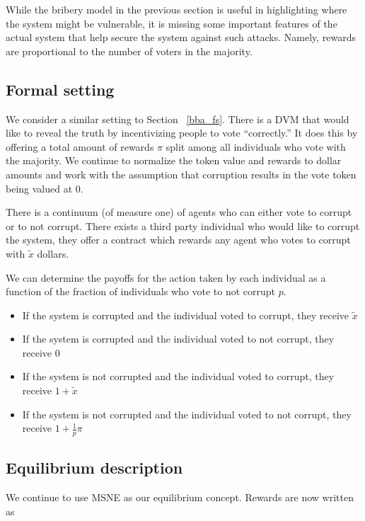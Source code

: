 \documentclass[12pt]{article}
\begin{document}
  While the bribery model in the previous section is useful in highlighting where the system might
  be vulnerable, it is missing some important features of the actual system that help secure the
  system against such attacks. Namely, rewards are proportional to the number of voters in the
  majority.

  \subsection{Formal setting}

    We consider a similar setting to Section ~\ref{bba_fs}. There is a DVM that would like to
    reveal the truth by incentivizing people to vote ``correctly.'' It does this by offering a
    total amount of rewards $\pi$ split among all individuals who vote with the majority. We
    continue to normalize the token value and rewards to dollar amounts and work with the
    assumption that corruption results in the vote token being valued at 0.

    There is a continuum (of measure one) of agents who can either vote to corrupt or to not
    corrupt. There exists a third party individual who would like to corrupt the system, they
    offer a contract which rewards any agent who votes to corrupt with $\tilde{x}$ dollars.

    We can determine the payoffs for the action taken by each individual as a function of the
    fraction of individuals who vote to not corrupt $p$.

    \begin{itemize}
      \item If the system is corrupted and the individual voted to corrupt, they receive
        $\tilde{x}$
      \item If the system is corrupted and the individual voted to not corrupt, they receive $0$
      \item If the system is not corrupted and the individual voted to corrupt, they receive
        $1 + \tilde{x}$
      \item If the system is not corrupted and the individual voted to not corrupt, they receive
        $1 + \frac{1}{p} \pi$
    \end{itemize}

  \subsection{Equilibrium description}

    We continue to use MSNE as our equilibrium concept. Rewards are now written as
\end{document}
